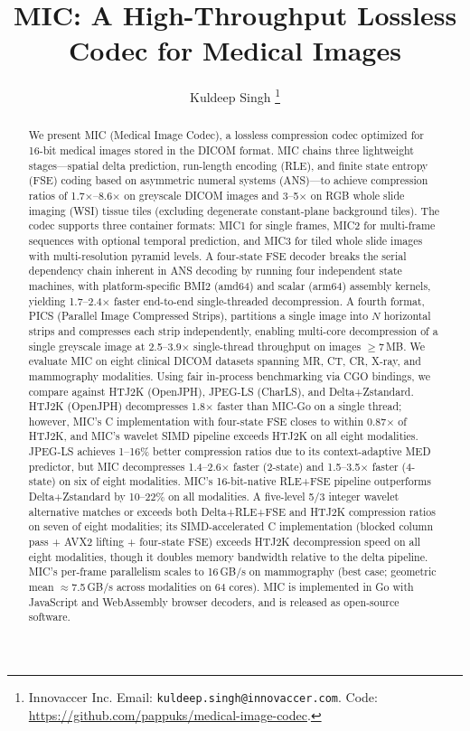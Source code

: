 \documentclass[11pt,twocolumn]{article}
\title{MIC: A High-Throughput Lossless Codec for Medical Images}
\author{Kuldeep Singh%
  \thanks{Innovaccer Inc.
    Email: \texttt{kuldeep.singh@innovaccer.com}.
    Code: \url{https://github.com/pappuks/medical-image-codec}.}
}
\date{}
\begin{document}
\maketitle

\begin{abstract}
We present MIC (Medical Image Codec), a lossless compression codec optimized for 16-bit medical images stored in the DICOM format.
MIC chains three lightweight stages---spatial delta prediction, run-length encoding (RLE), and finite state entropy (FSE) coding based on asymmetric numeral systems (ANS)---to achieve compression ratios of 1.7$\times$--8.6$\times$ on greyscale DICOM images and 3--5$\times$ on RGB whole slide imaging (WSI) tissue tiles (excluding degenerate constant-plane background tiles).
The codec supports three container formats: MIC1 for single frames, MIC2 for multi-frame sequences with optional temporal prediction, and MIC3 for tiled whole slide images with multi-resolution pyramid levels.
A four-state FSE decoder breaks the serial dependency chain inherent in ANS decoding by running four independent state machines, with platform-specific BMI2 (amd64) and scalar (arm64) assembly kernels, yielding 1.7--2.4$\times$ faster end-to-end single-threaded decompression.
A fourth format, PICS (Parallel Image Compressed Strips), partitions a single image into $N$ horizontal strips and compresses each strip independently, enabling multi-core decompression of a single greyscale image at 2.5--3.9$\times$ single-thread throughput on images $\geq$7\,MB.
We evaluate MIC on eight clinical DICOM datasets spanning MR, CT, CR, X-ray, and mammography modalities.
Using fair in-process benchmarking via CGO bindings, we compare against HTJ2K (OpenJPH), JPEG-LS (CharLS), and Delta+Zstandard.
HTJ2K (OpenJPH) decompresses 1.8$\times$ faster than MIC-Go on a single thread; however, MIC's C implementation with four-state FSE closes to within 0.87$\times$ of HTJ2K, and MIC's wavelet SIMD pipeline exceeds HTJ2K on all eight modalities.
JPEG-LS achieves 1--16\% better compression ratios due to its context-adaptive MED predictor, but MIC decompresses 1.4--2.6$\times$ faster (2-state) and 1.5--3.5$\times$ faster (4-state) on six of eight modalities.
MIC's 16-bit-native RLE+FSE pipeline outperforms Delta+Zstandard by 10--22\% on all modalities.
A five-level 5/3 integer wavelet alternative matches or exceeds both Delta+RLE+FSE and HTJ2K compression ratios on seven of eight modalities; its SIMD-accelerated C implementation (blocked column pass + AVX2 lifting + four-state FSE) exceeds HTJ2K decompression speed on all eight modalities, though it doubles memory bandwidth relative to the delta pipeline.
MIC's per-frame parallelism scales to 16\,GB/s on mammography (best case; geometric mean $\approx$7.5\,GB/s across modalities on 64 cores).
MIC is implemented in Go with JavaScript and WebAssembly browser decoders, and is released as open-source software.
\end{abstract}
\end{document}
